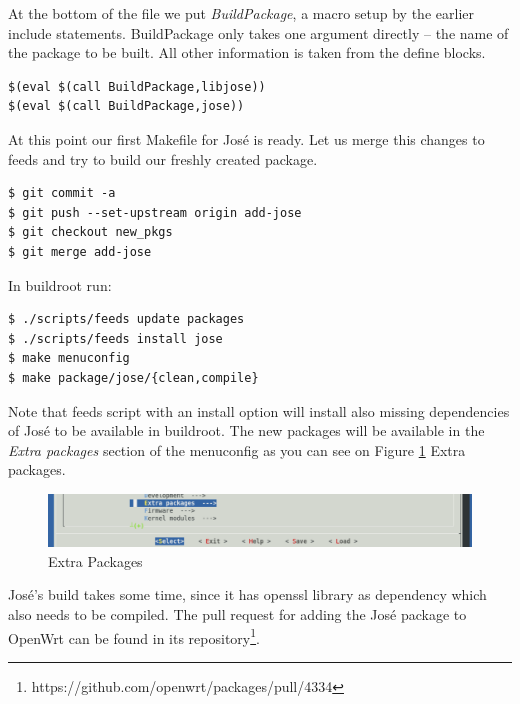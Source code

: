 At the bottom of the file we put {\it BuildPackage}, a macro setup by the earlier include statements.
BuildPackage only takes one argument directly -- the name of the package to be built.
All other information is taken from the define blocks.
\begin{lstlisting}[columns=fixed,basicstyle=\ttfamily\footnotesize,tabsize=4,backgroundcolor=\color{yellow!10}]
$(eval $(call BuildPackage,libjose))
$(eval $(call BuildPackage,jose))
\end{lstlisting}
At this point our first Makefile for José is ready.
Let us merge this changes to feeds and try to build our freshly created package.
\begin{lstlisting}[columns=fixed,basicstyle=\ttfamily\footnotesize,tabsize=4,backgroundcolor=\color{yellow!10}]
$ git commit -a
$ git push --set-upstream origin add-jose
$ git checkout new_pkgs
$ git merge add-jose
\end{lstlisting}
In buildroot run:
\begin{lstlisting}[columns=fixed,basicstyle=\ttfamily\footnotesize,tabsize=4,backgroundcolor=\color{yellow!10}]
$ ./scripts/feeds update packages
$ ./scripts/feeds install jose
$ make menuconfig
$ make package/jose/{clean,compile}
\end{lstlisting}
Note that feeds script with an install option will install also missing dependencies of José to be available in buildroot.
The new packages will be available in the {\it Extra packages} section of the menuconfig as you can see on Figure \ref{fig_extra} Extra packages.
\begin{figure}[h]
    \centering
    \includegraphics[scale=0.6]{figures/extra_packages.pdf}
    \caption{Extra Packages}
    \label{fig_extra}
\end{figure}
José's build takes some time, since it has openssl library as dependency which also needs to be compiled.
The pull request for adding the José package to OpenWrt can be found in its repository\footnote{https://github.com/openwrt/packages/pull/4334}.
